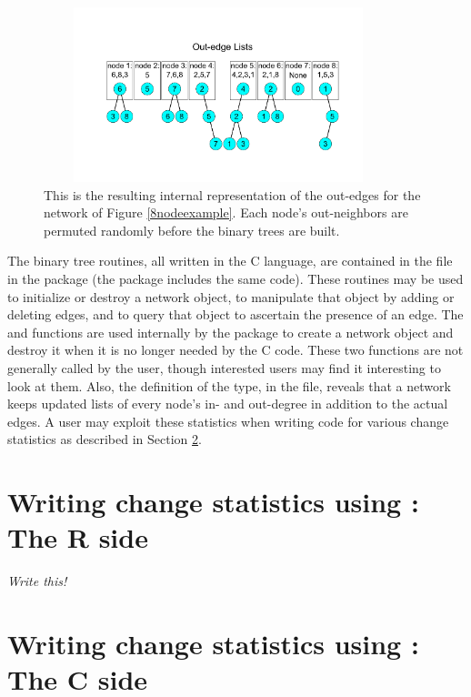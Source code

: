 \documentclass[article]{jss}
\begin{document}
\begin{figure}[htb]
\includegraphics[height=2in, width=4in]{outedgelists.pdf}
\caption{This is the resulting internal representation of the out-edges for the network of
Figure \ref{8nodeexample}.  Each node's out-neighbors are permuted randomly 
before the binary trees are built.}\label{outedgefig}
\end{figure}

The binary tree routines, all written in the C language, are contained in the 
 file in the  package (the  package
includes the same code).  These routines may be used to initialize or destroy
a network object, to manipulate that object by adding or deleting edges, and to
query that object to ascertain the presence of an edge.
The  and  functions 
are used internally by the  package to create a network object 
and destroy it when it is no longer needed by the C code.  These two functions
are not generally called by the user, though interested users may find it interesting
to look at them.  Also, the definition of the  type, in the 
 file, reveals that a network keeps updated lists of every node's
in- and out-degree in addition to the actual edges.  A user may exploit these statistics 
when writing code for various change statistics as described in Section \ref{Cside}.


\section[Writing change statistics using ergmuserterms:  The R side]%
{Writing change statistics using :  The R side}
\label{Rside}

{\em Write this!}

\section[Writing change statistics using ergmuserterms:  The C side]%
{Writing change statistics using :  The C side}
\label{Cside}
\end{document}
